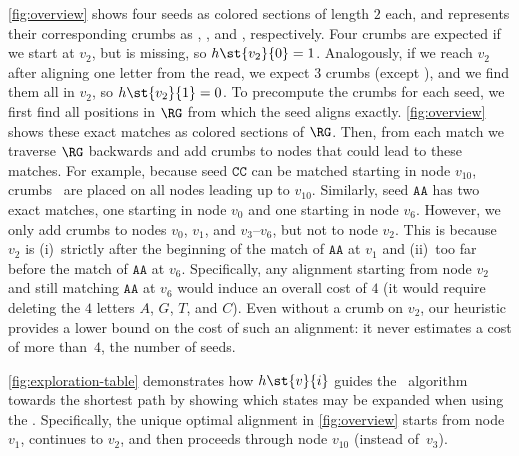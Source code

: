 %
\cref{fig:overview} shows four seeds as colored sections of length $2$ each, and
represents their corresponding crumbs as \bluecrumb{}, \yellowcrumb{},
\violetcrumb{} and \greencrumb{}, respectively. Four crumbs are expected if we
start at $v_2$, but \bluecrumb{} is missing, so $h\st{v_2}{0}=1$. Analogously,
if we reach $v_2$ after aligning one letter from the read, we expect 3 crumbs
(except \bluecrumb{}), and we find them all in $v_2$, so $h\st{v_2}{1}=0$.
%
To precompute the crumbs for each seed, we first find all positions in $\RG$
from which the seed aligns exactly. \cref{fig:overview} shows these exact
matches as colored sections of $\RG$. Then, from each match we traverse $\RG$
backwards and add crumbs to nodes that could lead to these matches.
%
For example, because seed \colorbox{light-yellow}{$\mathtt{CC}$} can be matched
starting in node $v_{10}$, crumbs~\yellowcrumb{} are placed on all nodes leading
up to $v_{10}$.
%
Similarly, seed \colorbox{light-blue}{$\mathtt{AA}$} has two exact matches, one
starting in node $v_{0}$ and one starting in node $v_{6}$.
%
However, we only add crumbs \bluecrumb{} to nodes $v_{0}$, $v_{1}$, and
$v_{3}$--$v_{6}$, but not to node $v_{2}$. This is because $v_{2}$ is
(i)~strictly after the beginning of the match of
\colorbox{light-blue}{$\mathtt{AA}$} at $v_1$ and (ii)~too far before the match
of \colorbox{light-blue}{$\mathtt{AA}$} at $v_{6}$.
%
Specifically, any alignment starting from node $v_{2}$ and still matching
\colorbox{light-blue}{$\mathtt{AA}$} at $v_{6}$ would induce an overall cost of
$4$ (it would require deleting the $4$ letters $A$, $G$, $T$, and $C$). Even
without a crumb \bluecrumb{} on $v_{2}$, our heuristic provides a lower bound on
the cost of such an alignment: it never estimates a cost of more than~$4$, the
number of seeds.




%
\cref{fig:exploration-table} demonstrates how $h\st{v}{i}$ guides the
\A~algorithm towards the shortest path by showing which states may be
\colorbox{pink-highlight}{expanded} when using the \seedh.
%
Specifically, the unique optimal alignment in \cref{fig:overview} starts from
node $v_{1}$, continues to $v_{2}$, and then proceeds through node $v_{10}$
(instead of~$v_{3}$).

